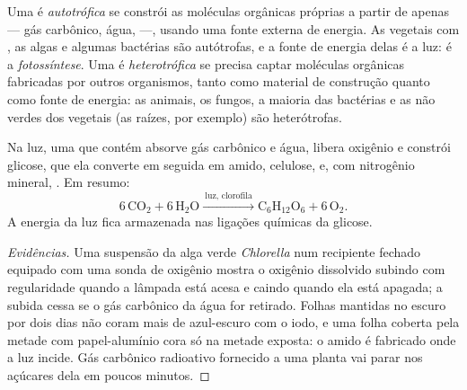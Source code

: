 \begin{definition}\label{def:g10:cell-metabolism:autotrophy}
Uma  é \emph{autotrófica} se constrói as
moléculas orgânicas próprias a partir de  apenas ---
gás carbônico, água,  ---, usando uma fonte externa de
energia. As  vegetais com , as algas e algumas
bactérias são autótrofas, e a fonte de energia delas é a luz: é a
\emph{fotossíntese}. Uma  é
\emph{heterotrófica} se precisa captar moléculas
orgânicas fabricadas por outros organismos, tanto como material de
construção quanto como fonte de energia: as  animais, os fungos,
a maioria das bactérias e as  não verdes dos vegetais (as
raízes, por exemplo) são heterótrofas.
\end{definition}

\begin{proposition}[A fotossíntese]\label{prop:g10:cell-metabolism:photosynthesis}
Na luz, uma  que contém  absorve gás carbônico e
água, libera oxigênio e constrói glicose, que ela converte em seguida
em amido, celulose,  e, com nitrogênio mineral, .
Em resumo:
\[
6\,\mathrm{CO_2} + 6\,\mathrm{H_2O} \xrightarrow{\ \text{luz, clorofila}\ }
\mathrm{C_6H_{12}O_6} + 6\,\mathrm{O_2}.
\]
A energia da luz fica armazenada nas ligações químicas da glicose.
\end{proposition}
\begin{proof}[Evidências]
Uma suspensão da alga verde \emph{Chlorella} num recipiente fechado
equipado com uma sonda de oxigênio mostra o oxigênio dissolvido subindo
com regularidade quando a lâmpada está acesa e caindo quando ela está
apagada; a subida cessa se o gás carbônico da água for retirado. Folhas
mantidas no escuro por dois dias não coram mais de azul-escuro com o
iodo, e uma folha coberta pela metade com papel-alumínio cora só na
metade exposta: o amido é fabricado onde a luz incide. Gás carbônico
radioativo fornecido a uma planta vai parar nos açúcares dela em poucos
minutos.
\end{proof}

